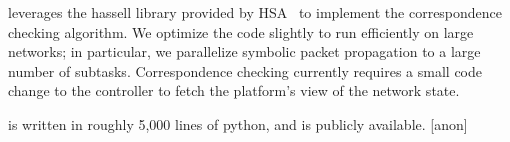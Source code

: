 \projectname{} leverages the hassell library provided by HSA~\cite{hsa}
to implement the correspondence checking algorithm. We optimize the code
slightly to run efficiently on large networks; in particular, we parallelize
symbolic packet propagation to a large number of subtasks. Correspondence
checking currently requires a small code change to the controller to fetch
the platform's view of the network state.

\projectname{} is written in roughly 5,000 lines of python, and is publicly
available. [anon]
